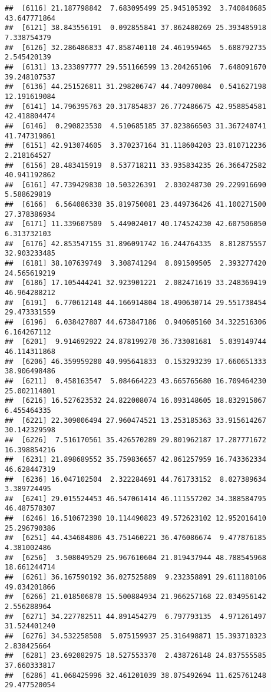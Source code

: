 \documentclass[
]{article}
\begin{document}
\begin{verbatim}
##  [6116] 21.187798842  7.683095499 25.945105392  3.740840685 43.647771864
##  [6121] 38.843556191  0.092855841 37.862480269 25.393485918  7.338754379
##  [6126] 32.286486833 47.858740110 24.461959465  5.688792735  2.545420139
##  [6131] 13.233897777 29.551166599 13.204265106  7.648091670 39.248107537
##  [6136] 44.251526811 31.298206747 44.740970084  0.541627198 12.191619084
##  [6141] 14.796395763 20.317854837 26.772486675 42.958854581 42.418804474
##  [6146]  0.290823530  4.510685185 37.023866503 31.367240741 41.747319861
##  [6151] 42.913074605  3.370237164 31.118604203 23.810712236  2.218164527
##  [6156] 28.483415919  8.537718211 33.935834235 26.366472582 40.941192862
##  [6161] 47.739429830 10.503226391  2.030248730 29.229916690  5.588629819
##  [6166]  6.564086338 35.819750081 23.449736426 41.100271500 27.378386934
##  [6171] 11.339607509  5.449024017 40.174524230 42.607506050  6.313732103
##  [6176] 42.853547155 31.896091742 16.244764335  8.812875557 32.903233485
##  [6181] 38.107639749  3.308741294  8.091509505  2.393277420 24.565619219
##  [6186] 17.105444241 32.923901221  2.082471619 33.248369419 46.964288212
##  [6191]  6.770612148 44.166914804 18.490630714 29.551738454 29.473331559
##  [6196]  6.038427807 44.673847186  0.940605160 34.322516306  6.164267112
##  [6201]  9.914692922 24.878199270 36.733081681  5.039149744 46.114311868
##  [6206] 46.359959280 40.995641833  0.153293239 17.660651333 38.906498486
##  [6211]  0.458163547  5.084664223 43.665765680 16.709464230 25.002114801
##  [6216] 16.527623532 24.822008074 16.093148605 18.832915067  6.455464335
##  [6221] 22.309006494 27.960474521 13.253185363 33.915614267 30.142329598
##  [6226]  7.516170561 35.426570289 29.801962187 17.287771672 16.398854216
##  [6231] 21.898689552 35.759836657 42.861257959 16.743362334 46.628447319
##  [6236] 16.047102504  2.322284691 44.761733152  8.027389634  3.389724495
##  [6241] 29.015524453 46.547061414 46.111557202 34.388584795 46.487578307
##  [6246] 16.510672390 10.114490823 49.572623102 12.952016410 25.296790386
##  [6251] 44.434684806 43.751460221 36.476086674  9.477876185  4.381002486
##  [6256]  3.508049529 25.967610604 21.019437944 48.788545968 18.661244714
##  [6261] 36.167590192 36.027525889  9.232358891 29.611180106 49.034201866
##  [6266] 21.018506878 15.500884934 21.966257168 22.034956142  2.556288964
##  [6271] 34.227782511 44.891454279  6.797793135  4.971261497 31.524401240
##  [6276] 34.532258508  5.075159937 25.316498871 15.393710323  2.838425664
##  [6281] 23.692082975 18.527553370  2.438726148 24.837555585 37.660333817
##  [6286] 41.068425996 32.461201039 38.075492694 11.625761248 29.477520054

\end{verbatim}
\end{document}
